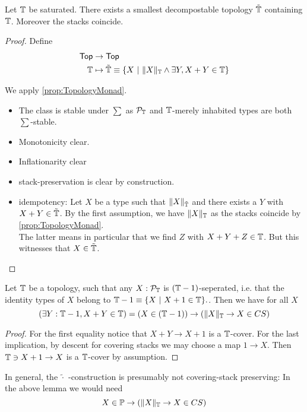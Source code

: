 \begin{prop}
	Let $\mathbb{T}$ be saturated. There exists a smallest decompostable topology $\tilde {\mathbb{T}}$ containing $\mathbb{T}$. Moreover the stacks coincide.	
\end{prop}
\begin{proof}
	Define
\begin{align*}
	\Top &\to \Top \\
	\bT &\mapsto \tilde \bT \equiv \{X \ | \ \|X\|_{\bT} \land \exists Y , X + Y \in \bT \} %
\end{align*}

	We apply \ref{prop:TopologyMonad}.
	\begin{itemize}
		\item 	The class is stable under $\sum$  as $\mathcal{P}_{\mathbb{T}}$ and $\mathbb{T}$-merely inhabited types are both  $\sum$-stable. \\
		\item Monotonicity clear.
		\item Inflationarity clear
		\item stack-preservation is clear by construction.
	\item idempotency: %
Let $X$ be a type such that $\|X\|_{\tilde {\mathbb{T}}}$ and there exists a $Y$  with $X + Y \in \tilde {\mathbb{T}}$. By the first assumption, we have $\|X\|_{\mathbb{T}}$ as the stacks coincide by \ref{prop:TopologyMonad}. \\
The latter means in particular that we find $Z$ with $X + Y + Z \in \mathbb{T}$. But this witnesses that $X  \in \tilde {\mathbb{T}}$.		
\end{itemize}

\end{proof}



\begin{lemma}
	Let $\mathbb{T}$ be a topology, such that any $X : \mathcal{P}_{\mathbb{T}}$ is $(\mathbb{T}-1)$-seperated, i.e. that the identity types of $X$ belong to $\mathbb{T}-1  \equiv \{X \ | \ X + 1 \in \mathbb{T}\}.$. Then we have for all $X$
	\[
	(\exists Y : \mathbb{T} - 1 , X + Y \in \mathbb{T}) = (X \in (\mathbb{T} - 1)) \to (\|X\|_{\mathbb{T}} \to X \in CS)
	\]
\end{lemma}
\begin{proof}
	For the first equality notice that $X + Y \to X + 1$ is a $\mathbb{T}$-cover. For the last implication, by descent for covering stacks we may choose a map $1 \to X$. Then $\mathbb{T} \ni X + 1 \to X$ is a $\mathbb{T}$-cover by assumption.
\end{proof}
\begin{warning}
	In general, the $\tilde \cdot$ -construction is presumably not covering-stack preserving: In the above lemma we would need 
	\[
	X \in \mathbb{P} \to (\|X\|_{\mathbb{T}} \to X \in CS)
	\]
\end{warning}

